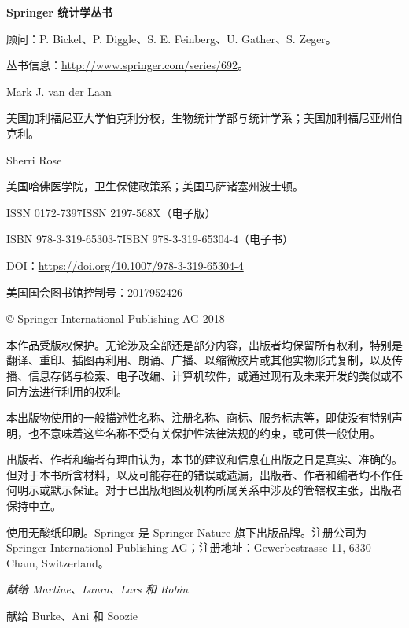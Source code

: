 
\clearpage
\thispagestyle{empty}
\begingroup\small
\noindent\textbf{Springer 统计学丛书}\par
顾问：P. Bickel、P. Diggle、S. E. Feinberg、U. Gather、S. Zeger。\par
丛书信息：\url{http://www.springer.com/series/692}。

\vspace{1em}
\noindent Mark J. van der Laan\par
美国加利福尼亚大学伯克利分校，生物统计学部与统计学系；美国加利福尼亚州伯克利。

\noindent Sherri Rose\par
美国哈佛医学院，卫生保健政策系；美国马萨诸塞州波士顿。

\vspace{1em}
\noindent ISSN 0172-7397\quad ISSN 2197-568X（电子版）\par
\noindent ISBN 978-3-319-65303-7\quad ISBN 978-3-319-65304-4（电子书）\par
\noindent DOI：\url{https://doi.org/10.1007/978-3-319-65304-4}\par
\noindent 美国国会图书馆控制号：2017952426\par
\noindent © Springer International Publishing AG 2018

本作品受版权保护。无论涉及全部还是部分内容，出版者均保留所有权利，特别是翻译、重印、插图再利用、朗诵、广播、以缩微胶片或其他实物形式复制，以及传播、信息存储与检索、电子改编、计算机软件，或通过现有及未来开发的类似或不同方法进行利用的权利。

本出版物使用的一般描述性名称、注册名称、商标、服务标志等，即使没有特别声明，也不意味着这些名称不受有关保护性法律法规的约束，或可供一般使用。

出版者、作者和编者有理由认为，本书的建议和信息在出版之日是真实、准确的。但对于本书所含材料，以及可能存在的错误或遗漏，出版者、作者和编者均不作任何明示或默示保证。对于已出版地图及机构所属关系中涉及的管辖权主张，出版者保持中立。

使用无酸纸印刷。Springer 是 Springer Nature 旗下出版品牌。注册公司为 Springer International Publishing AG；注册地址：Gewerbestrasse 11, 6330 Cham, Switzerland。
\endgroup
\clearpage
\thispagestyle{empty}
\vspace*{.3\textheight}
\begin{flushright}\itshape
献给 Martine、Laura、Lars 和 Robin\par
献给 Burke、Ani 和 Soozie
\end{flushright}
\clearpage
